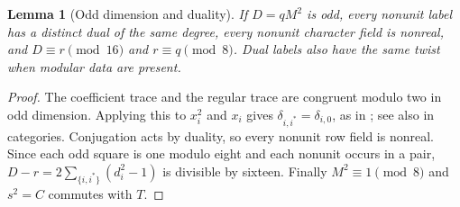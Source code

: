 \documentclass[11pt]{amsart}
\numberwithin{equation}{section}
\newtheorem{lemma}[theorem]{Lemma}
\theoremstyle{definition}
\theoremstyle{plain}
\begin{document}
\begin{lemma}[Odd dimension and duality]\label{alg:odd-parity}
If $D=qM^2$ is odd, every nonunit label has a distinct dual of the
same degree, every nonunit character field is nonreal, and
$D\equiv r\pmod{16}$ and $r\equiv q\pmod8$. Dual labels also have the same twist
when modular data are present.
\end{lemma}
\begin{proof}
The coefficient trace and the regular trace are congruent modulo two in odd dimension. Applying this to $x_i^2$ and $x_i$ gives $\delta_{i,i^*}=\delta_{i,0}$, as in \cite[Lemma~2.5]{BDPcore}; see also \cite[Corollary~8.2]{NSfs} in categories. Conjugation acts by duality, so every nonunit row field is nonreal. Since each odd square is one modulo eight and each nonunit occurs in a pair, $D-r=2\sum_{\{i,i^*\}}(d_i^2-1)$ is divisible by sixteen. Finally $M^2\equiv1\pmod8$ and $s^2=C$ commutes with $T$.
\end{proof}
\end{document}
